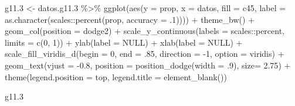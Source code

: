 \documentclass[
  12pt,
]{book}
\newenvironment{Shaded}{\begin{snugshade}}{\end{snugshade}}
\newcommand{\AttributeTok}[1]{\textcolor[rgb]{0.77,0.63,0.00}{#1}}
\newcommand{\ConstantTok}[1]{\textcolor[rgb]{0.00,0.00,0.00}{#1}}
\newcommand{\DecValTok}[1]{\textcolor[rgb]{0.00,0.00,0.81}{#1}}
\newcommand{\FloatTok}[1]{\textcolor[rgb]{0.00,0.00,0.81}{#1}}
\newcommand{\FunctionTok}[1]{\textcolor[rgb]{0.00,0.00,0.00}{#1}}
\newcommand{\NormalTok}[1]{#1}
\newcommand{\OtherTok}[1]{\textcolor[rgb]{0.56,0.35,0.01}{#1}}
\newcommand{\SpecialCharTok}[1]{\textcolor[rgb]{0.00,0.00,0.00}{#1}}
\newcommand{\StringTok}[1]{\textcolor[rgb]{0.31,0.60,0.02}{#1}}
\begin{document}
\begin{Shaded}
\begin{Highlighting}[]
\NormalTok{g11}\FloatTok{.3} \OtherTok{\textless{}{-}}\NormalTok{ datos.g11}\FloatTok{.3} \SpecialCharTok{\%\textgreater{}\%} 
  \FunctionTok{ggplot}\NormalTok{(}\FunctionTok{aes}\NormalTok{(}\AttributeTok{y =}\NormalTok{ prop, }\AttributeTok{x =}\NormalTok{ datos, }\AttributeTok{fill =}\NormalTok{ c45, }
             \AttributeTok{label =} \FunctionTok{as.character}\NormalTok{(scales}\SpecialCharTok{::}\FunctionTok{percent}\NormalTok{(prop, }\AttributeTok{accuracy =}\NormalTok{ .}\DecValTok{1}\NormalTok{)))) }\SpecialCharTok{+}
  \FunctionTok{theme\_bw}\NormalTok{() }\SpecialCharTok{+} 
  \FunctionTok{geom\_col}\NormalTok{(}\AttributeTok{position =} \StringTok{\textquotesingle{}dodge2\textquotesingle{}}\NormalTok{) }\SpecialCharTok{+}
  \FunctionTok{scale\_y\_continuous}\NormalTok{(}\AttributeTok{labels =}\NormalTok{ scales}\SpecialCharTok{::}\NormalTok{percent,}
                     \AttributeTok{limits =} \FunctionTok{c}\NormalTok{(}\DecValTok{0}\NormalTok{, }\DecValTok{1}\NormalTok{)) }\SpecialCharTok{+}
  \FunctionTok{ylab}\NormalTok{(}\AttributeTok{label =} \ConstantTok{NULL}\NormalTok{) }\SpecialCharTok{+}
  \FunctionTok{xlab}\NormalTok{(}\AttributeTok{label =} \ConstantTok{NULL}\NormalTok{) }\SpecialCharTok{+}
  \FunctionTok{scale\_fill\_viridis\_d}\NormalTok{(}\AttributeTok{begin =} \DecValTok{0}\NormalTok{, }\AttributeTok{end =}\NormalTok{ .}\DecValTok{85}\NormalTok{, }\AttributeTok{direction =} \SpecialCharTok{{-}}\DecValTok{1}\NormalTok{, }\AttributeTok{option =} \StringTok{\textquotesingle{}viridis\textquotesingle{}}\NormalTok{) }\SpecialCharTok{+}
  \FunctionTok{geom\_text}\NormalTok{(}\AttributeTok{vjust =} \SpecialCharTok{{-}}\FloatTok{0.8}\NormalTok{,}
            \AttributeTok{position =} \FunctionTok{position\_dodge}\NormalTok{(}\AttributeTok{width =}\NormalTok{ .}\DecValTok{9}\NormalTok{),}
            \AttributeTok{size=} \FloatTok{2.75}\NormalTok{)  }\SpecialCharTok{+} 
  \FunctionTok{theme}\NormalTok{(}\AttributeTok{legend.position =} \StringTok{\textquotesingle{}top\textquotesingle{}}\NormalTok{,}
        \AttributeTok{legend.title =} \FunctionTok{element\_blank}\NormalTok{())}

\NormalTok{g11}\FloatTok{.3}
\end{Highlighting}
\end{Shaded}
\end{document}
